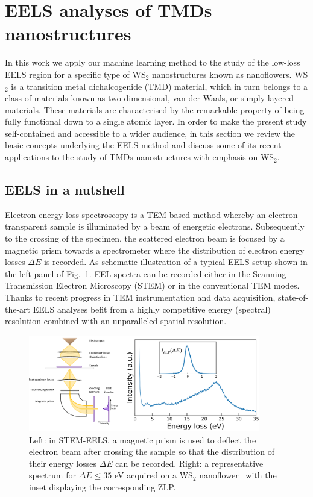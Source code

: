 \section{EELS analyses of TMDs nanostructures}
\label{sec:tmd}
\label{sec:eels}

In this work we apply our machine learning method to the study
of the low-loss EELS region for a specific type of WS$_2$ nanostructures known
as nanoflowers.
%
WS$_2$ is a transition metal dichalcogenide (TMD) material, which in turn
belongs to a class of materials known as two-dimensional, van der Waals, or simply layered materials.
%
These materials are
characterised by the remarkable property of being fully functional down to a single atomic layer.
%
In order to make the present study self-contained and accessible to a wider audience,
in this section we review the basic concepts underlying the EELS
method and discuss some of its recent applications to the study of TMDs nanostructures with emphasis
on WS$_2$.

\subsection{EELS in a nutshell}

Electron energy loss spectroscopy is a TEM-based method
whereby an electron-transparent sample is illuminated by a 
beam of energetic electrons.
%
Subsequently to the crossing of
the specimen, the scattered electron beam is focused by a magnetic prism
towards a spectrometer where the distribution of electron energy losses $\Delta E$ is recorded.
%
As schematic illustration of a typical EELS setup shown in the left panel of Fig.~\ref{fig:EELS}.
%
EEL spectra can be recorded either in the Scanning Transmission Electron Microscopy (STEM)
or in the conventional TEM modes.
%
Thanks to recent progress in TEM instrumentation and data acquisition, state-of-the-art EELS analyses befit from
a highly competitive energy (spectral) resolution combined with an unparalleled spatial resolution.

\begin{figure}[t]
    \centering
    \includegraphics[width=0.9\textwidth]{plots/EELS.pdf}
    \caption{Left: in STEM-EELS, a magnetic
      prism is used to deflect the electron beam after crossing the sample
      so that the distribution of their energy losses $\Delta E$ can be recorded.
      Right: a representative spectrum for $\Delta E \le 35$ eV acquired 
      on a WS$_2$ nanoflower~\cite{SabryaWS2} with
      the inset displaying the corresponding ZLP.
      }
    \label{fig:EELS}
\end{figure}


